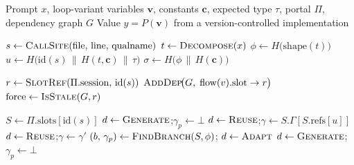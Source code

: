 \begin{algorithm}[t]
\caption{\textsc{Resolve-and-Dispatch}: DAG-Based Version Control with Reactive Invalidation}
\label{alg:resolve}
\begin{algorithmic}[1]

\Require Prompt $x$, loop-variant variables $\mathbf{v}$, constants $\mathbf{c}$,
  expected type $\tau$, portal $\Pi$, dependency graph $G$
\Ensure Value $y = P(\mathbf{v})$ from a version-controlled implementation

\Statex {}
\State $s \gets \textsc{CallSite}(\mathrm{file},\, \mathrm{line},\, \mathrm{qualname})$
\State $t \gets \textsc{Decompose}(x)$
\State $\phi \gets H\!\bigl(\mathrm{shape}(t)\bigr)$
\State $u \gets H\!\bigl(\mathrm{id}(s) \,\|\, H(t, \mathbf{c}) \,\|\, \tau\bigr)$
\State $\sigma \gets H\!\bigl(\phi \,\|\, H(\mathbf{c})\bigr)$

\Statex {}
\State $r \gets \textsc{SlotRef}(\Pi.\mathrm{session},\, \mathrm{id}(s))$
    \State $\textsc{AddDep}\!\bigl(G,\; \mathrm{flow}(v).\mathrm{slot} \to r\bigr)$
  \EndIf
\EndFor
\State $\mathrm{force} \gets \textsc{IsStale}(G, r)$

\Statex {}
\State $S \gets \Pi.\mathrm{slots}[\mathrm{id}(s)]$
  \State $d \gets \textsc{Generate}$;\quad $\gamma_p \gets \bot$
  \State $d \gets \textsc{Reuse}$;\quad $\gamma \gets S.\Gamma[S.\mathrm{refs}[u]]$
  \State $d \gets \textsc{Reuse}$;\quad $\gamma \gets \gamma'$
  \State $(b,\, \gamma_p) \gets \textsc{FindBranch}(S, \phi)$;\quad
         $d \gets \textsc{Adapt}$
\Else
  \State $d \gets \textsc{Generate}$;\quad $\gamma_p \gets \bot$
\EndIf


\end{algorithmic}
\end{algorithm}
